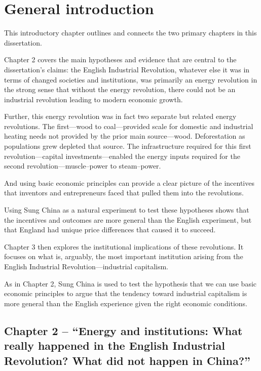 \linespread{1.9}
\chapter{General introduction}
\linespread{1.6}

	This introductory chapter outlines and connects the two primary chapters in this dissertation.
	
	Chapter 2 covers the main hypotheses and evidence that are central to the dissertation's claims: the English Industrial Revolution, whatever else it was in terms of changed societies and institutions, was primarily an energy revolution in the strong sense that without the energy revolution, there could not be an industrial revolution leading to modern economic growth.
	
	Further, this energy revolution was in fact two separate but related energy revolutions. The first---wood to coal---provided scale for domestic and industrial heating needs not provided by the prior main source---wood. Deforestation as populations grew depleted that source. The infrastructure required for this first revolution---capital investments---enabled the energy inputs required for the second revolution---muscle--power to steam--power.
	
	And using basic economic principles can provide a clear picture of the incentives that inventors and entrepreneurs faced that pulled them into the revolutions.
	
	Using Sung China as a natural experiment to test these hypotheses shows that the incentives and outcomes are more general than the English experiment, but that England had unique price differences that caused it to succeed.
	
	Chapter 3 then explores the institutional implications of these revolutions. It focuses on what is, arguably, the most important institution arising from the English Industrial Revolution---industrial capitalism.
	
	As in Chapter 2, Sung China is used to test the hypothesis that we can use basic economic principles to argue that the tendency toward industrial capitalism is more general than the English experience given the right economic conditions.


\linespread{1.0}
\section{Chapter 2 -- ``Energy and institutions: What really happened in the English
Industrial Revolution? What did not happen in China?''}
\linespread{1.6}
\vspace{.21in}

